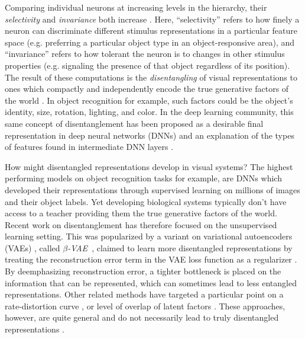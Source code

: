 \documentclass[10pt,letterpaper]{article}
\newcommand{\bvae}{$\beta$-VAE~}
\begin{document}
Comparing individual neurons at increasing levels in the hierarchy, their \textit{selectivity} and \textit{invariance} both increase \cite{Rust2010}. Here, ``selectivity'' refers to how finely a neuron can discriminate different stimulus representations in a particular feature space (e.g. preferring a particular object type in an object-responsive area), and ``invariance'' refers to how tolerant the neuron is to changes in other stimulus properties (e.g. signaling the presence of that object regardless of its position). The result of these computations is the \textit{disentangling} of visual representations to ones which compactly and independently encode the true generative factors of the world \cite{DiCarlo2007}. In object recognition for example, such factors could be the object's identity, size, rotation, lighting, and color. In the deep learning community, this same concept of disentanglement has been proposed as a desirable final representation in deep neural networks (DNNs) and an explanation of the types of features found in intermediate DNN layers \cite{Bengio2009}.


How might disentangled representations develop in visual systems? The highest performing models on object recognition tasks for example, are DNNs which developed their representations through supervised learning on millions of images and their object labels. Yet developing biological systems typically don't have access to a teacher providing them the true generative factors of the world. Recent work on disentanglement has therefore focused on the unsupervised learning setting. %
This was popularized by a variant on variational autoencoders (VAEs) \cite{Kingma2014}, called \textit{\bvae}, claimed to learn more disentangled representations by treating the reconstruction error term in the VAE loss function as a regularizer \cite{Higgins2017}. By deemphasizing reconstruction error, a tighter bottleneck is placed on the information that can be represented, which can sometimes lead to less entangled representations. Other related methods have targeted a particular point on a rate-distortion curve \cite{Alemi2017}, or level of overlap of latent factors \cite{Mathieu2018}. These approaches, however, are quite general and do not necessarily lead to truly disentangled representations \cite{Alemi2017,Mathieu2018}.
\end{document}
